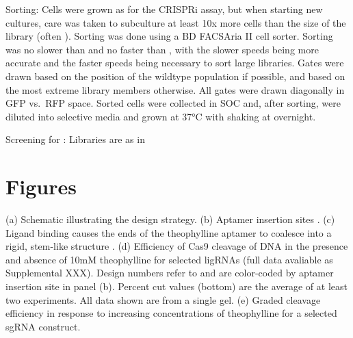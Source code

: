 \documentclass[10pt,oneside]{article}
\begin{document}
Sorting: Cells were grown as for the CRISPRi assay, but when starting new  
cultures, care was taken to subculture at least 10x more cells than the size of 
the library (often ).  Sorting was done using a BD FACSAria II cell 
sorter.  Sorting was no slower than  and no faster than 
, with the slower speeds being more accurate and the faster speeds 
being necessary to sort large libraries.  Gates were drawn based on the 
position of the wildtype population if possible, and based on the most extreme 
library members otherwise.  All gates were drawn diagonally in GFP vs.\ RFP 
space.  Sorted cells were collected in  SOC and, after sorting, were 
diluted into selective media and grown at 37°C with shaking at  
overnight.

Screening for \ligrnaB{}: Libraries are as in 

\section{Figures}



 (a) Schematic illustrating the design strategy.
%
%
 (b) Aptamer insertion sites \autocite{briner2014}.
%
%
 (c) Ligand binding causes the ends of the theophylline aptamer to coalesce 
%
%
 into a rigid, stem-like structure \autocite{zimmerman1997}.
 (d) Efficiency of \invitro{} Cas9 cleavage of DNA in the presence and absence 
 of 10mM theophylline for selected ligRNAs  (full data avaliable as 
 Supplemental XXX).  Design numbers refer to  and 
 are color-coded by aptamer insertion site in panel (b).  Percent cut values 
 (bottom) are 
%
%
 the average of at least two experiments.  All data shown are from a single 
 gel.
 (e) Graded cleavage efficiency in response to increasing concentrations of theophylline for a selected sgRNA construct.

\end{document}
